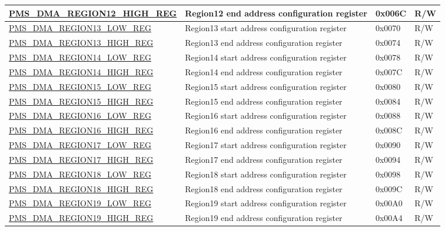 \begin{longtable}{ | L{7.4cm} | L{6cm} | L{1.3cm} | L{1cm} | }
\hyperref[regdesc:PMSDMAREGIONNHIGHREG]{PMS\_DMA\_REGION12\_HIGH\_REG} & Region12 end address configuration register & 0x006C & R/W \\ \hline
\hyperref[regdesc:PMSDMAREGIONNLOWREG]{PMS\_DMA\_REGION13\_LOW\_REG} & Region13 start address configuration register & 0x0070 & R/W \\ \hline
\hyperref[regdesc:PMSDMAREGIONNHIGHREG]{PMS\_DMA\_REGION13\_HIGH\_REG} & Region13 end address configuration register & 0x0074 & R/W \\ \hline
\hyperref[regdesc:PMSDMAREGIONNLOWREG]{PMS\_DMA\_REGION14\_LOW\_REG} & Region14 start address configuration register & 0x0078 & R/W \\ \hline
\hyperref[regdesc:PMSDMAREGIONNHIGHREG]{PMS\_DMA\_REGION14\_HIGH\_REG} & Region14 end address configuration register & 0x007C & R/W \\ \hline
\hyperref[regdesc:PMSDMAREGIONNLOWREG]{PMS\_DMA\_REGION15\_LOW\_REG} & Region15 start address configuration register & 0x0080 & R/W \\ \hline
\hyperref[regdesc:PMSDMAREGIONNHIGHREG]{PMS\_DMA\_REGION15\_HIGH\_REG} & Region15 end address configuration register & 0x0084 & R/W \\ \hline
\hyperref[regdesc:PMSDMAREGIONNLOWREG]{PMS\_DMA\_REGION16\_LOW\_REG} & Region16 start address configuration register & 0x0088 & R/W \\ \hline
\hyperref[regdesc:PMSDMAREGIONNHIGHREG]{PMS\_DMA\_REGION16\_HIGH\_REG} & Region16 end address configuration register & 0x008C & R/W \\ \hline
\hyperref[regdesc:PMSDMAREGIONNLOWREG]{PMS\_DMA\_REGION17\_LOW\_REG} & Region17 start address configuration register & 0x0090 & R/W \\ \hline
\hyperref[regdesc:PMSDMAREGIONNHIGHREG]{PMS\_DMA\_REGION17\_HIGH\_REG} & Region17 end address configuration register & 0x0094 & R/W \\ \hline
\hyperref[regdesc:PMSDMAREGIONNLOWREG]{PMS\_DMA\_REGION18\_LOW\_REG} & Region18 start address configuration register & 0x0098 & R/W \\ \hline
\hyperref[regdesc:PMSDMAREGIONNHIGHREG]{PMS\_DMA\_REGION18\_HIGH\_REG} & Region18 end address configuration register & 0x009C & R/W \\ \hline
\hyperref[regdesc:PMSDMAREGIONNLOWREG]{PMS\_DMA\_REGION19\_LOW\_REG} & Region19 start address configuration register & 0x00A0 & R/W \\ \hline
\hyperref[regdesc:PMSDMAREGIONNHIGHREG]{PMS\_DMA\_REGION19\_HIGH\_REG} & Region19 end address configuration register & 0x00A4 & R/W \\ \hline

\end{longtable}
